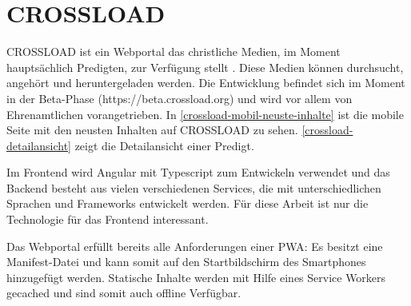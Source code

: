 \section{CROSSLOAD}
CROSSLOAD ist ein Webportal das christliche Medien, im Moment hauptsächlich Predigten, zur Verfügung stellt \autocite{crossload-org}. Diese Medien können durchsucht, angehört und heruntergeladen werden. Die Entwicklung befindet sich im Moment in der Beta-Phase (https://beta.crossload.org) und wird vor allem von Ehrenamtlichen vorangetrieben. In \autoref{crossload-mobil-neuste-inhalte} ist die mobile Seite mit den neusten Inhalten auf CROSSLOAD zu sehen. \autoref{crossload-detailansicht} zeigt die Detailansicht einer Predigt.

Im Frontend wird Angular mit Typescript zum Entwickeln verwendet und das Backend besteht aus vielen verschiedenen Services, die mit unterschiedlichen Sprachen und Frameworks entwickelt werden. Für diese Arbeit ist nur die Technologie für das Frontend interessant. 

Das Webportal erfüllt bereits alle Anforderungen einer \ac{PWA}: Es besitzt eine Manifest-Datei und kann somit auf den Startbildschirm des Smartphones hinzugefügt werden. Statische Inhalte werden mit Hilfe eines Service Workers gecached und sind somit auch offline Verfügbar. 


